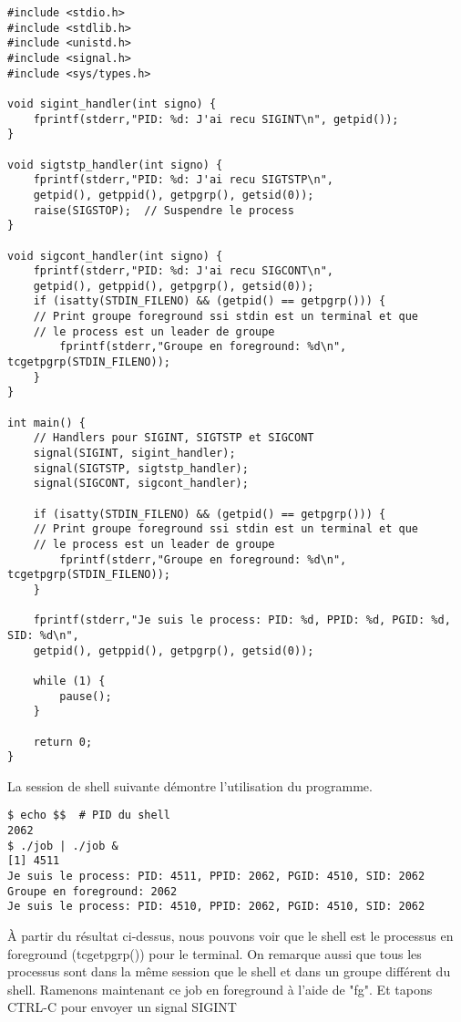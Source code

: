\begin{lstlisting}[caption={jobControl.c}, label={jobControl.c}]
#include <stdio.h>
#include <stdlib.h>
#include <unistd.h>
#include <signal.h>
#include <sys/types.h>

void sigint_handler(int signo) {
	fprintf(stderr,"PID: %d: J'ai recu SIGINT\n", getpid());
}

void sigtstp_handler(int signo) {
	fprintf(stderr,"PID: %d: J'ai recu SIGTSTP\n",
    getpid(), getppid(), getpgrp(), getsid(0));
	raise(SIGSTOP);  // Suspendre le process
}

void sigcont_handler(int signo) {
	fprintf(stderr,"PID: %d: J'ai recu SIGCONT\n",
    getpid(), getppid(), getpgrp(), getsid(0));
	if (isatty(STDIN_FILENO) && (getpid() == getpgrp())) {
    // Print groupe foreground ssi stdin est un terminal et que
    // le process est un leader de groupe
    	fprintf(stderr,"Groupe en foreground: %d\n", tcgetpgrp(STDIN_FILENO));
	}
}

int main() {
	// Handlers pour SIGINT, SIGTSTP et SIGCONT
	signal(SIGINT, sigint_handler);
	signal(SIGTSTP, sigtstp_handler);
	signal(SIGCONT, sigcont_handler);

    if (isatty(STDIN_FILENO) && (getpid() == getpgrp())) {
    // Print groupe foreground ssi stdin est un terminal et que
    // le process est un leader de groupe
    	fprintf(stderr,"Groupe en foreground: %d\n", tcgetpgrp(STDIN_FILENO));
	}

	fprintf(stderr,"Je suis le process: PID: %d, PPID: %d, PGID: %d, SID: %d\n",
    getpid(), getppid(), getpgrp(), getsid(0));

	while (1) {
    	pause();
	}

	return 0;
}
\end{lstlisting}

La session de shell suivante démontre l'utilisation du programme.
\newline

\begin{lstlisting}[style=blackstyle]
$ echo $$  # PID du shell
2062
$ ./job | ./job & 
[1] 4511
Je suis le process: PID: 4511, PPID: 2062, PGID: 4510, SID: 2062
Groupe en foreground: 2062
Je suis le process: PID: 4510, PPID: 2062, PGID: 4510, SID: 2062
\end{lstlisting}

À partir du résultat ci-dessus, nous pouvons voir que le shell est le processus en foreground (tcgetpgrp())
pour le terminal. On remarque aussi que tous les processus sont dans la même session que le shell et dans un groupe différent du shell.
\newline
Ramenons maintenant ce job en foreground à l'aide de "fg". Et tapons CTRL-C pour envoyer un signal SIGINT

